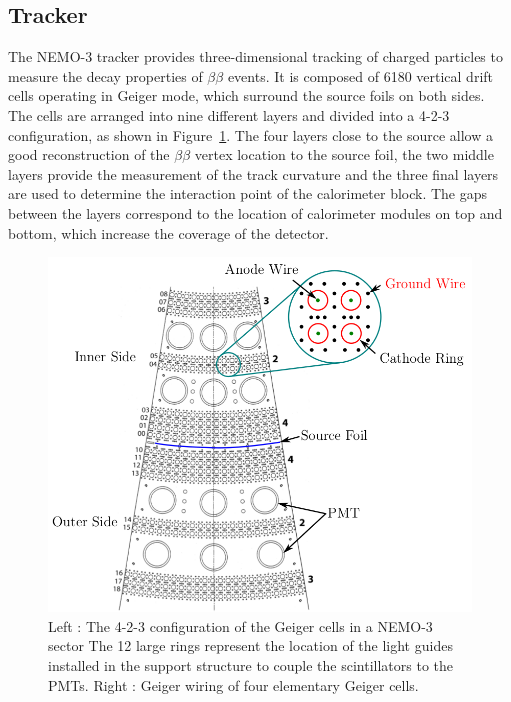 \documentclass[main.tex]{subfiles}
\begin{document}
\FloatBarrier


\subsection{Tracker}


\NI The NEMO-3 tracker provides three-dimensional tracking of charged particles to measure the decay properties of $\beta\beta$ events. It is composed of 6180 vertical drift cells operating in Geiger mode, which surround the source foils on both sides. The cells are arranged into nine different layers and divided into a 4-2-3 configuration, as shown in Figure~\ref{TrackerNEMOView}. The four layers close to the source allow a good reconstruction of the $\beta\beta$ vertex location to the source foil, the two middle layers provide the measurement of the track curvature and the three final layers are used to determine the interaction point of the calorimeter block. The gaps between the layers correspond to the location of calorimeter modules on top and bottom, which increase the coverage of the detector.


\bigskip


\begin{figure}[h!]
\begin{center}
\includegraphics[scale=0.30]{pictures/Chap3/TrackerNEMOview.png}
\caption{Left : The 4-2-3 configuration of the Geiger cells in a NEMO-3 sector The 12 large rings represent the location of the light guides installed in the support structure to couple the scintillators to the PMTs. Right : Geiger
wiring of four elementary Geiger cells.}
\label{TrackerNEMOView}
\end{center}
\end{figure}
\end{document}
